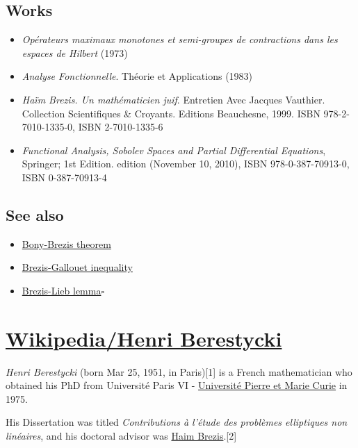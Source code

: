 \documentclass{book}
\numberwithin{equation}{section}
\begin{document}
\section{Works}
\begin{itemize}
    \item \textit{Opérateurs maximaux monotones et semi-groupes de contractions dans les espaces de Hilbert} (1973)
    \item \textit{Analyse Fonctionnelle}. Théorie et Applications (1983)
    \item \textit{Haïm Brezis. Un mathématicien juif}. Entretien Avec Jacques Vauthier. Collection Scientifiques \& Croyants. Editions Beauchesne, 1999. ISBN 978-2-7010-1335-0, ISBN 2-7010-1335-6
    \item \textit{Functional Analysis, Sobolev Spaces and Partial Differential Equations}, Springer; 1st Edition. edition (November 10, 2010), ISBN 978-0-387-70913-0, ISBN 0-387-70913-4
\end{itemize}

\section{See also}
\begin{itemize}
    \item \href{https://en.wikipedia.org/wiki/Bony%E2%80%93Brezis_theorem}{Bony-Brezis theorem}
    \item \href{https://en.wikipedia.org/wiki/Brezis%E2%80%93Gallouet_inequality}{Brezis-Gallouet inequality}
    \item \href{https://en.wikipedia.org/wiki/Brezis%E2%80%93Lieb_lemma}{Brezis-Lieb lemma}\hfill$\square$
\end{itemize}


\chapter{\href{https://en.wikipedia.org/wiki/Henri_Berestycki}{Wikipedia/Henri Berestycki}}

\textit{Henri Berestycki} (born Mar 25, 1951, in Paris)[1] is a French mathematician who obtained his PhD from Université Paris VI - \href{https://en.wikipedia.org/wiki/Universit\%C3\%A9_Pierre_et_Marie_Curie}{Université Pierre et Marie Curie} in 1975.

His Dissertation was titled \textit{Contributions à l'étude des problèmes elliptiques non linéaires}, and his doctoral advisor was \href{https://en.wikipedia.org/wiki/Haim_Brezis}{Haim Brezis}.[2]
\end{document}
